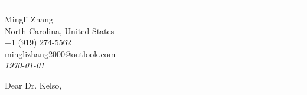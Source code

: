 \documentclass[
	12pt, %
]{letter}
\begin{document}



\vspace{-1.75cm} %

\rule{\linewidth}{1pt} %

\medskip %


\begingroup
	\raggedleft %
	\small %
	Mingli Zhang \\ %
	North Carolina, United States \\
	+1 (919) 274-5562 \\ %
	minglizhang2000@outlook.com\\ %
	\bigskip %
	{\normalsize\textit{\today}}\\ %
\endgroup



\bigskip %


\medskip %

Dear Dr. Kelso,

\smallskip %
\end{document}
